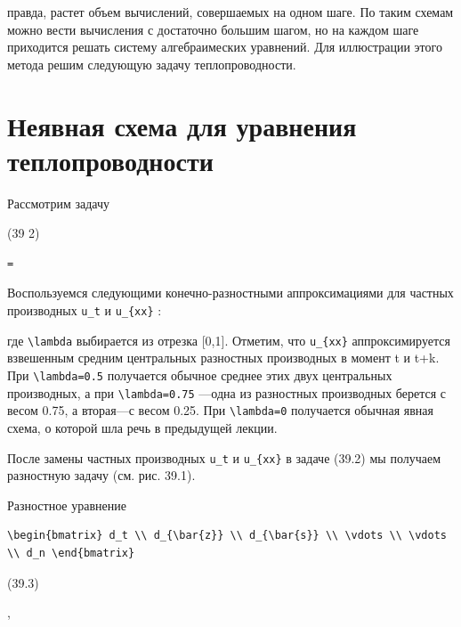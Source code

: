 \documentclass[
  ukrainian,
]{article}
\begin{document}
правда, растет объем вычислений, совершаемых на одном шаге. По таким
схемам можно вести вычисления с достаточно большим шагом, но на каждом
шаге приходится решать систему алгебраимеских уравнений. Для иллюстрации
этого метода решим следующую задачу теплопроводности.

\section{Неявная схема для уравнения
теплопроводности}\label{ux43dux435ux44fux432ux43dux430ux44f-ux441ux445ux435ux43cux430-ux434ux43bux44f-ux443ux440ux430ux432ux43dux435ux43dux438ux44f-ux442ux435ux43fux43bux43eux43fux440ux43eux432ux43eux434ux43dux43eux441ux442ux438}

Рассмотрим задачу

(39 2)

\begin{verbatim}
=
\end{verbatim}

Воспользуемся следующими конечно-разностными аппроксимациями для частных
производных \texttt{u\_t} и \texttt{u\_\{xx\}} :

где \texttt{\textbackslash{}lambda} выбирается из отрезка {[}0,1{]}.
Отметим, что \texttt{u\_\{xx\}} аппроксимируется взвешенным средним
центральных разностных производных в момент t и t+k. При
\texttt{\textbackslash{}lambda=0.5} получается обычное среднее этих двух
центральных производных, а при \texttt{\textbackslash{}lambda=0.75}
---одна из разностных производных берется с весом 0.75, а вторая---с
весом 0.25. При \texttt{\textbackslash{}lambda=0} получается обычная
явная схема, о которой шла речь в предыдущей лекции.

После замены частных производных \texttt{u\_t} и \texttt{u\_\{xx\}} в
задаче (39.2) мы получаем разностную задачу (см. рис. 39.1).

Разностное уравнение

\begin{verbatim}
\begin{bmatrix} d_t \\ d_{\bar{z}} \\ d_{\bar{s}} \\ \vdots \\ \vdots \\ d_n \end{bmatrix}
\end{verbatim}

(39.3)

,
\end{document}
